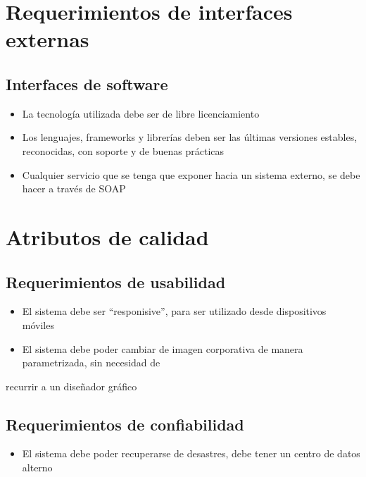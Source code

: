 \documentclass[letterpaper,10pt,spanish]{sphinxmanual}
\begin{document}
\section{Requerimientos de interfaces externas}
\label{\detokenize{SRS:requerimientos-de-interfaces-externas}}

\subsection{Interfaces de software}
\label{\detokenize{SRS:interfaces-de-software}}\begin{itemize}
\item {} 
\sphinxAtStartPar
La tecnología utilizada debe ser de libre licenciamiento

\item {} 
\sphinxAtStartPar
Los lenguajes, frameworks y librerías deben ser las últimas versiones estables, reconocidas, con\sphinxhyphen{} soporte y de buenas prácticas

\item {} 
\sphinxAtStartPar
Cualquier servicio que se tenga que exponer hacia un sistema externo, se debe hacer a través de SOAP

\end{itemize}


\section{Atributos de calidad}
\label{\detokenize{SRS:atributos-de-calidad}}

\subsection{Requerimientos de usabilidad}
\label{\detokenize{SRS:requerimientos-de-usabilidad}}\begin{itemize}
\item {} 
\sphinxAtStartPar
El sistema debe ser “responisive”, para ser utilizado desde dispositivos móviles

\item {} 
\sphinxAtStartPar
El sistema debe poder cambiar de imagen corporativa de manera parametrizada, sin necesidad de

\end{itemize}

\sphinxAtStartPar
recurrir a un diseñador gráfico


\subsection{Requerimientos de confiabilidad}
\label{\detokenize{SRS:requerimientos-de-confiabilidad}}\begin{itemize}
\item {} 
\sphinxAtStartPar
El sistema debe poder recuperarse de desastres, debe tener un centro de datos alterno

\end{itemize}
\end{document}
